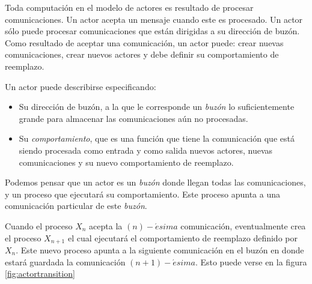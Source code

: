 Toda computación en el modelo de actores es resultado de procesar comunicaciones. Un actor acepta un mensaje cuando este es procesado. Un actor sólo puede procesar comunicaciones que están dirigidas a su dirección de buzón. Como resultado de aceptar una comunicación, un actor puede: crear nuevas comunicaciones, crear nuevos actores y debe definir su comportamiento de reemplazo.


Un actor puede describirse especificando:

\begin{itemize}
 \item Su dirección de buzón, a la que le corresponde un \textit{buzón} lo suficientemente grande para almacenar las comunicaciones aún no procesadas.
 \item Su \textit{comportamiento}, que es una función que tiene la comunicación que está siendo procesada como entrada y como salida nuevos actores, nuevas comunicaciones y su nuevo comportamiento de reemplazo.
\end{itemize}

Podemos pensar que un actor es un \textit{buzón} donde llegan todas las comunicaciones, y un proceso que ejecutará su comportamiento. Este proceso apunta a una comunicación particular de este \textit{buzón}. 

% 
% 
% 
% 
% 
% 
% 
% 


Cuando el proceso $X_n$ acepta la $(n)-\acute{e}sima$ comunicación, eventualmente crea el proceso $X_{n+1}$ el cual ejecutará el comportamiento de reemplazo definido por $X_n$. Este nuevo proceso apunta a la siguiente comunicación en el buzón en donde estará guardada la comunicación $(n+1)-\acute{e}sima$. Esto puede verse en la figura \ref{fig:actortransition}

